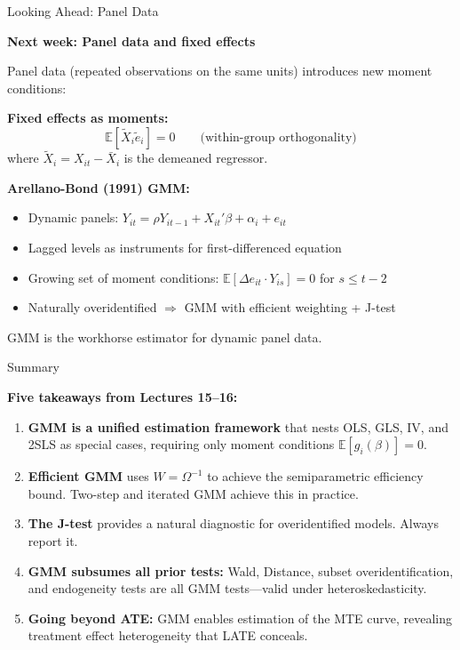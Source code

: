 \documentclass[aspectratio=169, handout]{beamer}
\numberwithin{equation}{section}
\begin{document}
\begin{frame}{Looking Ahead: Panel Data}

\textbf{Next week: Panel data and fixed effects}

\medskip
Panel data (repeated observations on the same units) introduces new moment conditions:

\medskip
\textbf{Fixed effects as moments:}
$$\mathbb{E}[\tilde X_i \tilde e_i] = 0 \qquad\text{(within-group orthogonality)}$$
where $\tilde X_i = X_{it} - \bar X_i$ is the demeaned regressor.

\medskip
\textbf{Arellano-Bond (1991) GMM:}
\begin{itemize}
\item Dynamic panels: $Y_{it} = \rho Y_{it-1} + X_{it}'\beta + \alpha_i + e_{it}$
\item Lagged levels as instruments for first-differenced equation
\item Growing set of moment conditions: $\mathbb{E}[\Delta e_{it} \cdot Y_{is}] = 0$ for $s \leq t-2$
\item Naturally overidentified $\Rightarrow$ GMM with efficient weighting + J-test
\end{itemize}

\medskip
\alert{GMM is the workhorse estimator for dynamic panel data.}

\end{frame}

\begin{frame}{Summary}

\textbf{Five takeaways from Lectures 15--16:}

\smallskip
\begin{enumerate}\itemsep=2pt
\item \textbf{GMM is a unified estimation framework} that nests OLS, GLS, IV, and 2SLS as special cases, requiring only moment conditions $\mathbb{E}[g_i(\beta)] = 0$.

\item \textbf{Efficient GMM} uses $W = \Omega^{-1}$ to achieve the semiparametric efficiency bound. Two-step and iterated GMM achieve this in practice.

\item \textbf{The J-test} provides a natural diagnostic for overidentified models. Always report it.

\item \textbf{GMM subsumes all prior tests:} Wald, Distance, subset overidentification, and endogeneity tests are all GMM tests---valid under heteroskedasticity.

\item \textbf{Going beyond ATE:} GMM enables estimation of the MTE curve, revealing treatment effect heterogeneity that LATE conceals.
\end{enumerate}

\end{frame}
\end{document}
